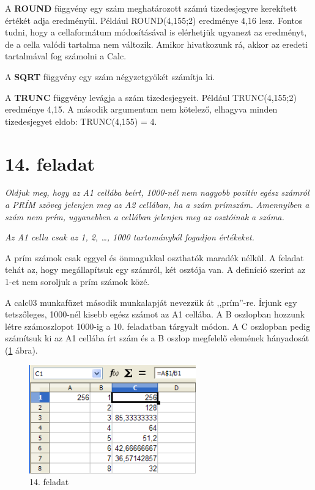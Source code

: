A \textbf{ROUND} függvény egy szám meghatározott számú
tizedesjegyre kerekített értékét adja eredményül.
Például ROUND(4,155;2) eredménye 4,16 lesz. Fontos tudni, hogy a
cellaformátum módosításával is elérhetjük ugyanezt az
eredményt, de a cella valódi tartalma nem változik. Amikor
hivatkozunk rá, akkor az eredeti tartalmával fog számolni a Calc.

A \textbf{SQRT} függvény egy szám négyzetgyökét számítja
ki.

A \textbf{TRUNC} függvény levágja a szám tizedesjegyeit.
Például TRUNC(4,155;2) eredménye 4,15. A második argumentum nem
kötelező, elhagyva minden tizedesjegyet eldob: TRUNC(4,155) = 4.


\section{14. feladat}
{\itshape
Oldjuk meg, hogy az A1 cellába beírt, 1000-nél nem nagyobb
pozitív egész számról a PRÍM szöveg jelenjen meg az A2
cellában, ha a szám prímszám. Amennyiben a szám nem prím,
ugyanebben a cellában jelenjen meg az osztóinak a száma.}

{\itshape
Az A1 cella csak az 1, 2, {\dots}, 1000 tartományból fogadjon
értékeket.}

A prím számok csak eggyel és önmagukkal
oszthatók maradék nélkül. A feladat tehát az, hogy
megállapítsuk egy számról, két osztója van. A definíció
szerint az 1-et nem soroljuk a prím számok közé.

A calc03 munkafüzet második munkalapját nevezzük át
,,prím''-re. Írjunk egy
tetszőleges, 1000-nél kisebb egész számot az A1 cellába. A
B oszlopban hozzunk létre számoszlopot 1000-ig a 10. feladatban
tárgyalt módon. A C oszlopban pedig számítsuk ki az A1
cellába írt szám és a B oszlop megfelelő elemének
hányadosát (\ref{14-feladat} ábra).

\begin{figure}[!h]
\begin{center}
\includegraphics[width=7.203cm]{oocalcv1-img77.png}
\caption{14. feladat}\label{14-feladat}
\end{center}
\end{figure}

